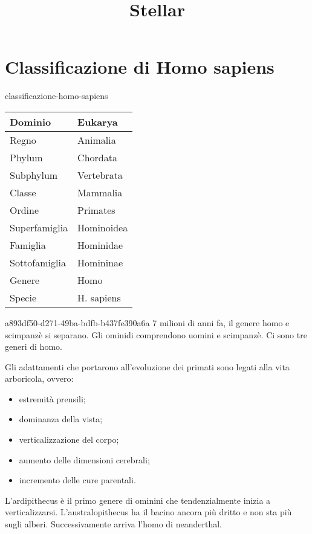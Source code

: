 \documentclass[preview]{standalone}
\begin{document}
\title{Stellar}
\genpage

\section{Classificazione di Homo sapiens}

\begin{snippet}{classificazione-homo-sapiens}
    \vspace{0.25cm}
    \begin{center}
        \begin{tabular}{|l|l|}
            \hline Dominio & Eukarya \\
            \hline Regno & Animalia \\
            \hline Phylum & Chordata \\
            \hline Subphylum & Vertebrata \\
            \hline Classe & Mammalia \\
            \hline Ordine & Primates \\
            \hline Superfamiglia & Hominoidea \\
            \hline Famiglia & Hominidae \\
            \hline Sottofamiglia & Homininae \\
            \hline Genere & Homo \\
            \hline Specie & H. sapiens \\
            \hline
        \end{tabular}
    \end{center}
    \vspace{0.25cm}
\end{snippet}

\begin{snippet}{a893df50-d271-49ba-bdfb-b437fe390a6a}
    7 milioni di anni fa, il genere homo e scimpanzè si separano.
    Gli ominidi comprendono uomini e scimpanzè.
    Ci sono tre generi di homo.

    Gli adattamenti che portarono all'evoluzione dei primati sono legati alla
    vita arboricola, ovvero:
    \begin{itemize}
        \item estremità prensili;
        \item dominanza della vista;
        \item verticalizzazione del corpo;
        \item aumento delle dimensioni cerebrali;
        \item incremento delle cure parentali.
    \end{itemize}

    L'ardipithecus è il primo genere di ominini che tendenzialmente inizia a verticalizzarsi.
    L'australopithecus ha il bacino ancora più dritto e non sta più sugli alberi.
    Successivamente arriva l'homo di neanderthal.
\end{snippet}



\end{document}
